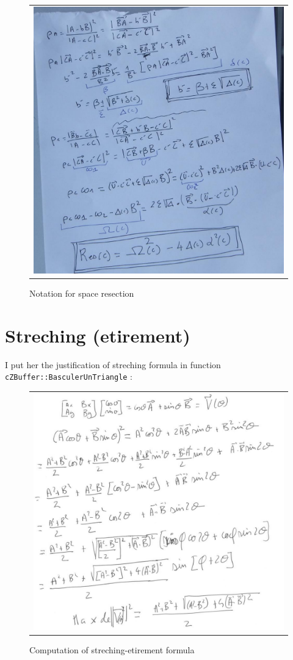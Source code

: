 \begin{figure}
\begin{tabular}{|c|}
   \hline \hline
   \includegraphics[width=160mm]{FIGS/Formules/NotattionSpace.JPG}
\end{tabular}
\label{Not:ResSpace}
\caption{Notation for space resection}
\end{figure}


\section{Streching (etirement)}

I put her the justification of streching formula in function {\tt cZBuffer::BasculerUnTriangle} :

\begin{figure}
\begin{tabular}{|c|}
   \hline \hline
   \includegraphics[width=160mm]{FIGS/Formules/CalcEtir.JPG}
\end{tabular}
\label{Not:ResSpace}
\caption{Computation of streching-etirement formula}
\end{figure}


